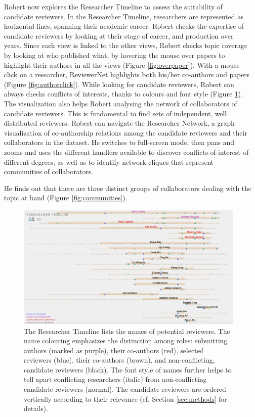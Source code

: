 Robert now explores the Researcher Timeline to assess the suitability of candidate reviewers. In the Researcher Timeline, researchers are represented as horizontal lines, spanning their academic career. Robert checks the expertise of candidate reviewers by looking at their stage of career, and production over years. Since each view is linked to the other views, Robert checks topic coverage by looking at who published what, by hovering the mouse over papers to highlight their authors in all the views (Figure \ref{fig:overpaper}). With a mouse click on a researcher, ReviewerNet highlights both his/her co-authors and papers (Figure \ref{fig:authorclick}).
While looking for candidate reviewers, Robert can always checks conflicts of interests, thanks to colours and font style (Figure \ref{fig:selected}). The visualization also helps Robert analysing the network of collaborators of candidate reviewers. This is fundamental to find sets of independent, well distributed reviewers. Robert can navigate the Researcher Network, a graph visualization of co-authorship relations among the candidate reviewers and their collaborators in the dataset. He switches to full-screen mode, then pans and zooms and uses the different handlers available to discover conflicts-of-interest of different degrees, as well as to identify network cliques that represent communities of collaborators. 

He finds out that there are three distinct groups of collaborators dealing with the topic at hand (Figure \ref{fig:communities}).

\begin{figure}[!ht]
    \centering
    \includegraphics[width=\textwidth]{fig/timeline_cropped.png}
    \caption{The Researcher Timeline lists the names of potential reviewers. The name colouring emphasizes the distinction among roles: submitting authors (marked as purple), their co-authors (red), selected reviewers (blue), their co-authors (brown), and non-conflicting, candidate reviewers (black). The font style of names further helps to tell apart conflicting researchers (italic) from non-conflicting candidate reviewers (normal). The candidate reviewers are ordered vertically according to their relevance (cf. Section \ref{sec:methods} for details).}%
    \label{fig:selected}
\end{figure}

